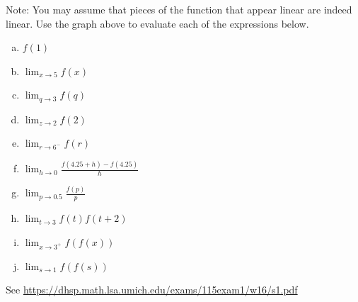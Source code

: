 \documentclass[11pt]{exam}
\begin{document}
\begin{questions}
Note: You may assume that pieces of the function that appear linear are indeed linear.
Use the graph above to evaluate each of the expressions below.
\begin{multicols}{2}
\begin{enumerate}[(a)]
	\item $f(1)$
	\item $\displaystyle\lim_{x \rightarrow 5} f(x)$
	\item $\displaystyle\lim_{q \rightarrow 3} f(q)$
	\item $\displaystyle\lim_{z \rightarrow 2} f(2)$
	\item $\displaystyle\lim_{r \rightarrow 6^-} f(r)$
	\item $\displaystyle\lim_{h \rightarrow 0} \frac{f(4.25+h)-f(4.25)}{h}$
	\item $\displaystyle\lim_{p \rightarrow 0.5} \frac{f(p)}{p}$
	\item $\displaystyle\lim_{t \rightarrow 3} f(t)f(t+2)$
	\item $\displaystyle\lim_{x \rightarrow 3^+} f(f(x))$
	\item $\displaystyle\lim_{s \rightarrow 1} f(f(s))$
\end{enumerate}
\end{multicols}
\begin{solution}
 See \href{https://dhsp.math.lsa.umich.edu/exams/115exam1/w16/s1.pdf}{https://dhsp.math.lsa.umich.edu/exams/115exam1/w16/s1.pdf}
\end{solution}
\end{questions}
\end{document}
